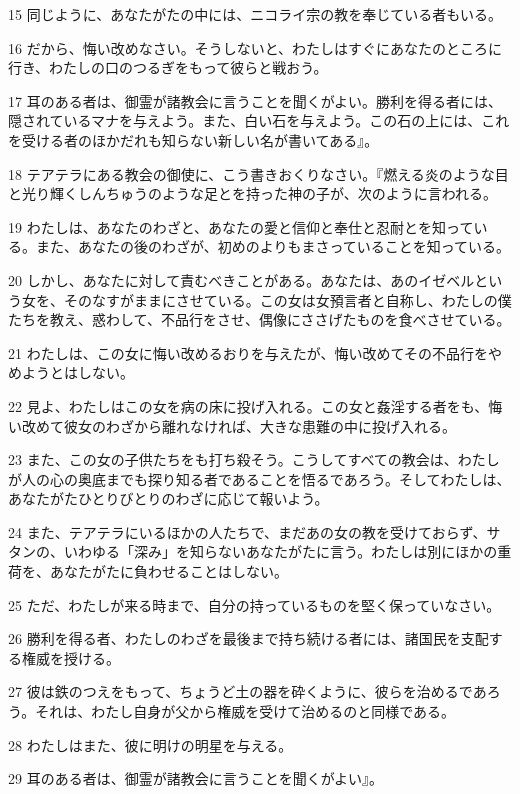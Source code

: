 \par 15 同じように、あなたがたの中には、ニコライ宗の教を奉じている者もいる。
\par 16 だから、悔い改めなさい。そうしないと、わたしはすぐにあなたのところに行き、わたしの口のつるぎをもって彼らと戦おう。
\par 17 耳のある者は、御霊が諸教会に言うことを聞くがよい。勝利を得る者には、隠されているマナを与えよう。また、白い石を与えよう。この石の上には、これを受ける者のほかだれも知らない新しい名が書いてある』。
\par 18 テアテラにある教会の御使に、こう書きおくりなさい。『燃える炎のような目と光り輝くしんちゅうのような足とを持った神の子が、次のように言われる。
\par 19 わたしは、あなたのわざと、あなたの愛と信仰と奉仕と忍耐とを知っている。また、あなたの後のわざが、初めのよりもまさっていることを知っている。
\par 20 しかし、あなたに対して責むべきことがある。あなたは、あのイゼベルという女を、そのなすがままにさせている。この女は女預言者と自称し、わたしの僕たちを教え、惑わして、不品行をさせ、偶像にささげたものを食べさせている。
\par 21 わたしは、この女に悔い改めるおりを与えたが、悔い改めてその不品行をやめようとはしない。
\par 22 見よ、わたしはこの女を病の床に投げ入れる。この女と姦淫する者をも、悔い改めて彼女のわざから離れなければ、大きな患難の中に投げ入れる。
\par 23 また、この女の子供たちをも打ち殺そう。こうしてすべての教会は、わたしが人の心の奥底までも探り知る者であることを悟るであろう。そしてわたしは、あなたがたひとりびとりのわざに応じて報いよう。
\par 24 また、テアテラにいるほかの人たちで、まだあの女の教を受けておらず、サタンの、いわゆる「深み」を知らないあなたがたに言う。わたしは別にほかの重荷を、あなたがたに負わせることはしない。
\par 25 ただ、わたしが来る時まで、自分の持っているものを堅く保っていなさい。
\par 26 勝利を得る者、わたしのわざを最後まで持ち続ける者には、諸国民を支配する権威を授ける。
\par 27 彼は鉄のつえをもって、ちょうど土の器を砕くように、彼らを治めるであろう。それは、わたし自身が父から権威を受けて治めるのと同様である。
\par 28 わたしはまた、彼に明けの明星を与える。
\par 29 耳のある者は、御霊が諸教会に言うことを聞くがよい』。

